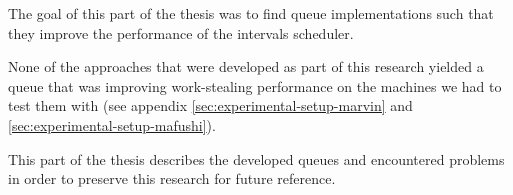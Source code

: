 
The goal of this part of the thesis was to find queue implementations
such that they improve the performance of the intervals scheduler.

None of the approaches that were developed as part of this research
yielded a queue that was improving work-stealing performance on the
machines we had to test them with (see appendix
\ref{sec:experimental-setup-marvin} and
\ref{sec:experimental-setup-mafushi}).


This part of the thesis describes the developed queues and encountered
problems in order to preserve this research for future reference.


